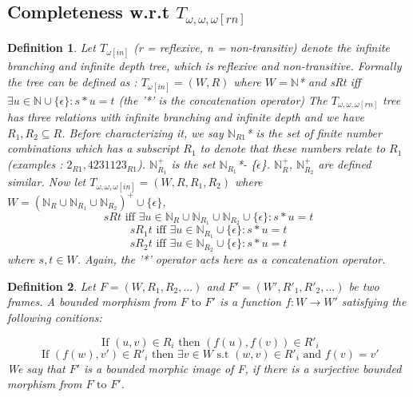 \documentclass[12pt, a4paper]{scrartcl}
\newtheorem{definition}{Definition}[subsection]
\begin{document}
\subsection{Completeness w.r.t $T_{\omega,\omega,\omega[rn]}$}

\begin{definition}
    Let $T_{\omega [in]}$ (r = reflexive, n = non-transitiv) denote the infinite branching and infinite depth tree, which is reflexive and non-transitive.
    Formally the tree can be defined as : $T_{\omega [in]} = (W, R)$ where $W = \mathbb{N}$* and sRt iff $\exists u \in \mathbb{N} \cup \{\epsilon\} : s*u = t$ (the '*' is the concatenation operator) \newline \newline
    The $T_{\omega,\omega,\omega [rn]}$ tree has three relations with infinite branching and infinite depth and we have $R_1,R_2 \subseteq R$. Before characterizing it, we say
    $\mathbb{N}_{R1}$* is the set of finite number combinations which has a subscript $R_1$ to denote that these numbers relate to $R_1$  \newline 
    (examples : $2_{R1}, 4231123_{R1}$).
    $\mathbb{N}^+_{R_1}$ is the set $\mathbb{N}_{R_1}$*- \{$\epsilon$\}. $\mathbb{N}^+_{R}$, $\mathbb{N}^+_{R_2}$ are defined similar. \newline \newline
    Now let $T_{\omega,\omega,\omega [in]} = (W, R, R_1, R_2 )$ where $W = (\mathbb{N}_{R} \cup \mathbb{N}_{R_1} \cup \mathbb{N}_{R_2})^+ \cup \{ \epsilon\}$, 
    $$sRt \mbox{ iff } \exists u \in \mathbb{N}_{R} \cup \mathbb{N}_{R_1} \cup \mathbb{N}_{R_2} \cup \{\epsilon\} : s*u = t$$
    $$sR_1t \mbox { iff } \exists u \in \mathbb{N}_{R_1} \cup \{\epsilon\} : s * u = t$$
    $$sR_2t \mbox { iff } \exists u \in \mathbb{N}_{R_2} \cup \{\epsilon\} : s * u = t$$
    where $s,t \in W$. Again, the '*' operator acts here as a concatenation operator.
        
\end{definition}

\begin{definition}
    Let $F = (W,R_1, R_2, ...)$ and $F' = (W', R'_1, R'_2, ...)$ be two frames. A bounded morphism from $F \mbox{ to } F'$ is a function
    $f : W \rightarrow W'$ satisfying the following conitions: 
    
    $$ \mbox{ If } (u,v) \in R_i  \mbox{ then }(f(u), f(v)) \in R'_i $$
    $$ \mbox{ If } (f(w), v') \in R'_i \mbox{ then } \exists v \in W \mbox{ s.t } (w,v) \in R'_i \mbox{ and } f(v) = v'$$
    We say that $F'$ is a bounded morphic image of F, if there is a surjective bounded morphism from $F \mbox{ to } F'$.
        
\end{definition}
\end{document}
